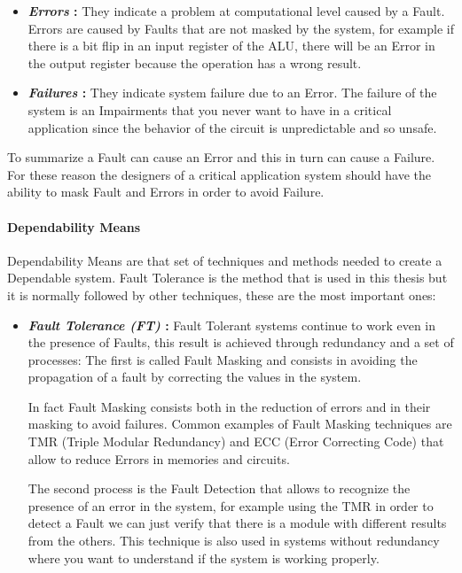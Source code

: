 {{{{\begin{itemize}
					\item \textbf{\textit{Errors} : } They indicate a problem at computational level caused by a Fault. Errors are caused by Faults that are not masked by the system, for example if there is a  bit flip in an input register of the ALU, there will be an Error in the output register because the operation has a wrong result.
					
					\item \textbf{\textit{Failures} : }  They indicate system failure due to an Error. The failure of the system is an Impairments that you never want to have in a critical application since the behavior of the circuit is unpredictable and so unsafe. 
				\end{itemize}	
				To summarize a Fault can cause an Error and this in turn can cause a Failure. For these reason the designers of a critical application system should have the ability to mask Fault and Errors in order to avoid Failure.
			} %
			\paragraph*{Dependability Means}{
				Dependability Means are that set of techniques and methods needed to create a Dependable system. Fault Tolerance is the method that is used in this thesis but it is normally followed by other techniques, these are the most important ones:
				\begin{itemize}
					\item \textbf{\textit{Fault Tolerance (FT)} : } Fault Tolerant systems continue to work even in the presence of Faults, this result is achieved through redundancy and a set of processes: The first is called Fault Masking and consists in avoiding the propagation of a fault by correcting the values in the system.
					
					In fact Fault Masking consists both in the reduction of errors and in their masking to avoid failures. 
					Common examples of Fault Masking techniques are TMR (Triple Modular Redundancy) and ECC (Error Correcting Code) that allow to reduce Errors in memories and circuits. 
					
					The second process is the Fault Detection that allows to recognize the presence of an error in the system, for example using the TMR in order to detect a Fault we can just verify that there is a module with different results from the others.
					This technique is also used in systems without redundancy where you want to understand if the system is working properly.
					

\end{itemize}}}}}
